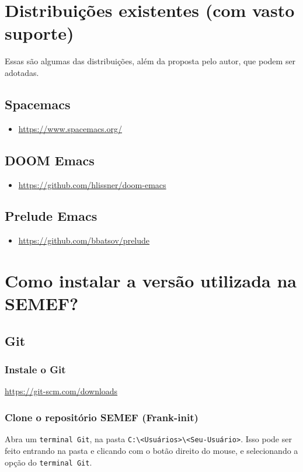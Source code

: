\documentclass[11pt]{article}
\date{\today}
\title{}
\begin{document}
\tableofcontents


\section{Distribuições existentes (com vasto suporte)}
\label{sec:org5361ea1}
Essas são algumas das distribuições, além da proposta pelo autor, que podem ser adotadas.
\subsection{Spacemacs}
\label{sec:org2474e8e}
\begin{itemize}
\item \url{https://www.spacemacs.org/}
\end{itemize}
\subsection{DOOM Emacs}
\label{sec:org0bee1b7}
\begin{itemize}
\item \url{https://github.com/hlissner/doom-emacs}
\end{itemize}
\subsection{Prelude Emacs}
\label{sec:orgb51cd62}
\begin{itemize}
\item \url{https://github.com/bbatsov/prelude}
\end{itemize}

\section{Como instalar a versão utilizada na SEMEF?}
\label{sec:org9b300e2}
\subsection{Git}
\label{sec:org93fb830}
\subsubsection{Instale o Git}
\label{sec:orgddc796b}
\url{https://git-scm.com/downloads}
\subsubsection{Clone o repositório SEMEF (Frank-init)}
\label{sec:org7a03ef5}
Abra um \texttt{terminal Git}, na pasta \texttt{C:\textbackslash{}<Usuários>\textbackslash{}<Seu-Usuário>}. Isso
pode ser feito entrando na pasta e clicando com o botão direito do
mouse, e selecionando a opção do \texttt{terminal Git}.
\end{document}
